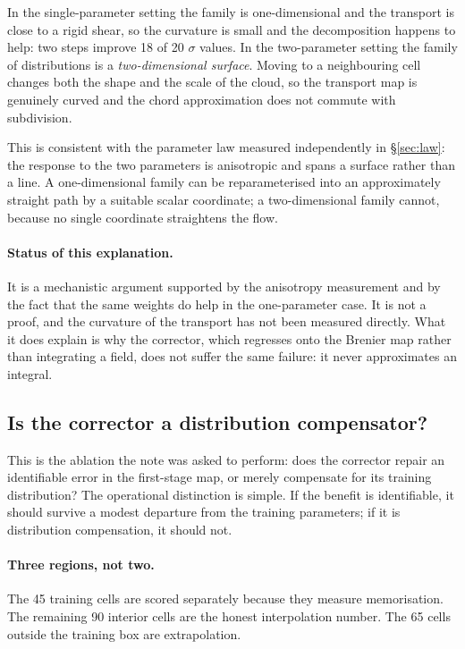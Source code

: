 ﻿\documentclass[11pt,a4paper]{article}
\begin{document}
In the single-parameter setting the family is one-dimensional and the transport is close to a
rigid shear, so the curvature is small and the decomposition happens to help: two steps improve
18 of 20 $\sigma$ values. In the two-parameter setting the family of distributions is a
\emph{two-dimensional surface}. Moving to a neighbouring cell changes both the shape and the
scale of the cloud, so the transport map is genuinely curved and the chord approximation does
not commute with subdivision.

This is consistent with the parameter law measured independently in \S\ref{sec:law}: the
response to the two parameters is anisotropic and spans a surface rather than a line. A
one-dimensional family can be reparameterised into an approximately straight path by a suitable
scalar coordinate; a two-dimensional family cannot, because no single coordinate straightens the
flow.

\paragraph{Status of this explanation.} It is a mechanistic argument supported by the anisotropy
measurement and by the fact that the same weights do help in the one-parameter case. It is not a
proof, and the curvature of the transport has not been measured directly. What it does explain
is why the corrector, which regresses onto the Brenier map rather than integrating a field, does
not suffer the same failure: it never approximates an integral.

\subsection{Is the corrector a distribution compensator?}
\label{sec:compensator}

This is the ablation the note was asked to perform: does the corrector repair an identifiable
error in the first-stage map, or merely compensate for its training distribution? The
operational distinction is simple. If the benefit is identifiable, it should survive a modest
departure from the training parameters; if it is distribution compensation, it should not.

\paragraph{Three regions, not two.} The 45 training cells are scored separately because they
measure memorisation. The remaining 90 interior cells are the honest interpolation number. The
65 cells outside the training box are extrapolation.
\end{document}
